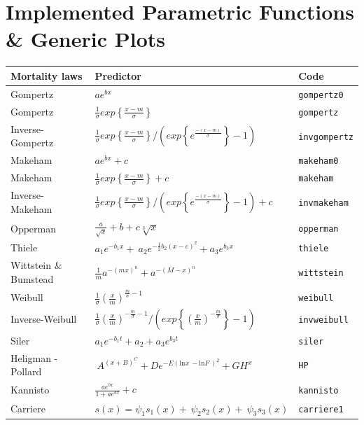 \documentclass[a0,portrait]{a0poster}\usepackage[]{graphicx}\usepackage[]{color}
\begin{document}
\section*{Implemented Parametric Functions \& Generic Plots}
\begin{table}[h!]
\renewcommand{\arraystretch}{1.4}
\begin{tabular}{lll}
    \toprule \textbf{Mortality laws}  & \textbf{Predictor} & Code\tnote{\textdagger} \\ \hline
    Gompertz & $ae^{bx}$ & \texttt{gompertz0} \\
    Gompertz & $\frac{1}{\sigma }exp\left\{\frac{x-m}{\sigma }\right\}$ & \texttt{gompertz} \\
    Inverse-Gompertz & ${\frac{1}{\sigma }exp\left\{\frac{x-m}{\sigma }\right\}}/{\left(exp\left\{e^{\frac{-(x-m)}{\sigma }}\right\}-1\right)}$ & \texttt{invgompertz}\\
    Makeham & $ae^{bx}+c$ & \texttt{makeham0} \\
    Makeham & $\frac{1}{\sigma }exp\left\{\frac{x-m}{\sigma }\right\} + c$ & \texttt{makeham} \\
    Inverse-Makeham & ${\frac{1}{\sigma }exp\left\{\frac{x-m}{\sigma }\right\}}/{\left(exp\left\{e^{\frac{-(x-m)}{\sigma }}\right\}-1\right)}+c$ & \texttt{invmakeham} \\
    Opperman & $ \frac{a}{\sqrt{x}}+b+c\sqrt[3]{x}$ & \texttt{opperman} \\
    Thiele & $ a_1e^{-b_1x}+\ a_2e^{-\frac{1}{2}b_2{\left(x-c\right)}^2}+a_3e^{b_3x}$ & \texttt{thiele} \\
    Wittstein \& Bumstead & $\frac{1}{m}a^{{-\left(mx\right)}^n}+a^{{-\left(M-x\right)}^n}$ & \texttt{wittstein} \\
    Weibull& $\frac{1}{\sigma }{\left(\frac{x}{m}\right)}^{\frac{m}{\sigma }-1}$ & \texttt{weibull} \\
    Inverse-Weibull & ${\frac{1}{\sigma }{\left(\frac{x}{m}\right)}^{-\frac{m}{\sigma }-1}}/{\left(exp\left\{{\left(\frac{x}{m}\right)}^{-\frac{m}{\sigma }}\right\}-1\right)}$ &  \texttt{invweibull} \\
    Siler  & $a_1e^{-b_1t}+a_2+a_3e^{b_3t}$ & \texttt{siler} \\
    Heligman - Pollard& $\ A^{{\left(x+B\right)}^C}+De^{-E{\left({\mathrm{ln} x\ }-{\mathrm{ln} F\ }\right)}^2}+GH^x$ & \texttt{HP} \\
    Kannisto & $\frac{ae^{bx}}{1+ae^{bx}}+c$ & \texttt{kannisto} \\
    Carriere\tnote{*} & $s\left(x\right)={\psi}_1s_1\left(x\right)+\ {\psi }_2s_2\left(x\right)+\ {\psi }_3s_3\left(x\right)$ & \texttt{carriere1} \\
    \bottomrule
  \end{tabular}

\end{table}
\end{document}

